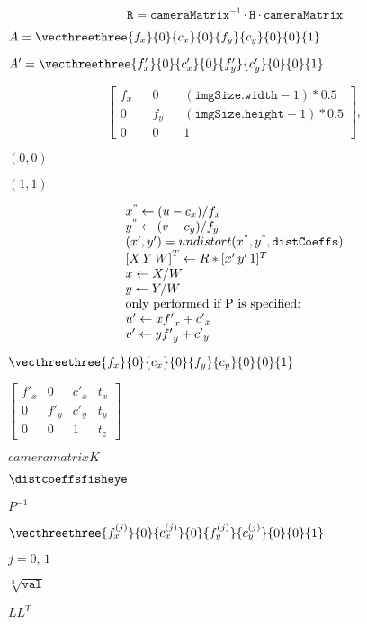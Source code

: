 \documentclass{article}
\begin{document}
\[\texttt{R} = \texttt{cameraMatrix} ^{-1} \cdot \texttt{H} \cdot \texttt{cameraMatrix}\]
\pagebreak

$A=\vecthreethree{f_x}{0}{c_x}{0}{f_y}{c_y}{0}{0}{1}$
\pagebreak

$A'=\vecthreethree{f_x'}{0}{c_x'}{0}{f_y'}{c_y'}{0}{0}{1}$
\pagebreak

\[\begin{bmatrix} f_x && 0 && ( \texttt{imgSize.width} -1)*0.5 \\ 0 && f_y && ( \texttt{imgSize.height} -1)*0.5 \\ 0 && 0 && 1 \end{bmatrix} ,\]
\pagebreak

$(0,0)$
\pagebreak

$(1,1)$
\pagebreak

\[ \begin{array}{l} x^{"} \leftarrow (u - c_x)/f_x \\ y^{"} \leftarrow (v - c_y)/f_y \\ (x',y') = undistort(x^{"},y^{"}, \texttt{distCoeffs}) \\ {[X\,Y\,W]} ^T \leftarrow R*[x' \, y' \, 1]^T \\ x \leftarrow X/W \\ y \leftarrow Y/W \\ \text{only performed if P is specified:} \\ u' \leftarrow x {f'}_x + {c'}_x \\ v' \leftarrow y {f'}_y + {c'}_y \end{array} \]
\pagebreak

$\vecthreethree{f_x}{0}{c_x}{0}{f_y}{c_y}{0}{0}{1}$
\pagebreak

$\begin{bmatrix} {f'}_x & 0 & {c'}_x & t_x \\ 0 & {f'}_y & {c'}_y & t_y \\ 0 & 0 & 1 & t_z \end{bmatrix}$
\pagebreak

$cameramatrix{K}$
\pagebreak

$\distcoeffsfisheye$
\pagebreak

$P^{-1}$
\pagebreak

$\vecthreethree{f_x^{(j)}}{0}{c_x^{(j)}}{0}{f_y^{(j)}}{c_y^{(j)}}{0}{0}{1}$
\pagebreak

$j = 0,\, 1$
\pagebreak

$\sqrt[3]{\texttt{val}}$
\pagebreak

$LL^T$
\pagebreak
\end{document}
